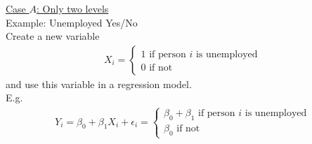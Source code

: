 \documentclass[11pt,a4paper,numbers=endperiod]{scrartcl}
\begin{document}
{\underline{Case $A$: Only two levels}\\

Example: Unemployed Yes/No \\
Create a new variable \begin{align*}
	X_i = \begin{cases}
	1 \text{ if person $i$ is unemployed}\\
	0 \text{ if not} 
	\end{cases}
\end{align*}
and use this variable in a regression model.\\
E.g. \begin{align*}
	Y_i = \beta_0 + \beta_1 X_i + \epsilon_i = \begin{cases}
	\beta_0 + \beta_1 \text{ if person $i$ is unemployed}\\
	\beta_0 \text{ if not}
	\end{cases}
\end{align*}

}
\end{document}
